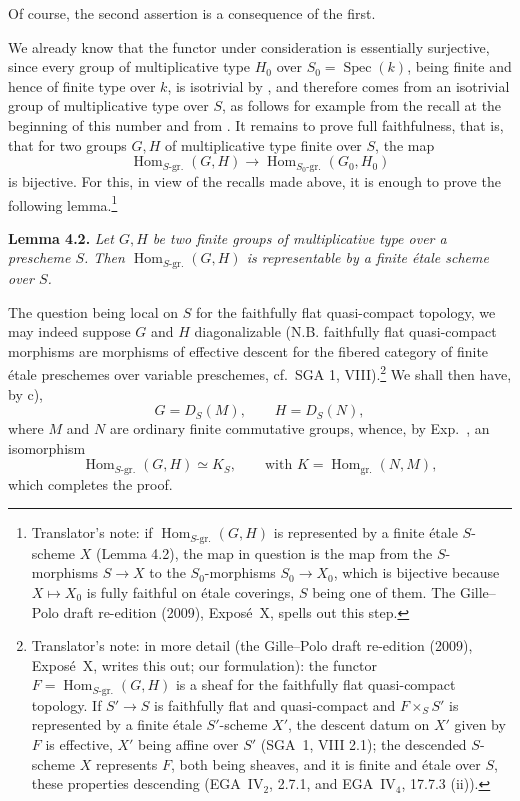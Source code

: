 Of course, the second assertion is a consequence of the first.

We already know that the functor under consideration is essentially
surjective, since every group of multiplicative type \(H_0\) over
\(S_0=\operatorname{Spec}(k)\), being finite and hence of finite type over
\(k\), is isotrivial by , and therefore comes from an isotrivial group of
multiplicative type over \(S\), as follows for example from the recall at the
beginning of this number and from . It remains to prove full
faithfulness, that is, that for two groups \(G,H\) of multiplicative type
finite over \(S\), the map
\[
  \operatorname{Hom}_{S\text{-gr.}}(G,H)
  \longrightarrow
  \operatorname{Hom}_{S_0\text{-gr.}}(G_0,H_0)
\]
is bijective. For this, in view of the recalls made above, it is enough to
prove the following lemma.\footnote{Translator's note: if
\(\operatorname{Hom}_{S\text{-gr.}}(G,H)\) is represented by a finite étale
\(S\)-scheme \(X\) (Lemma 4.2), the map in question is the map from the
\(S\)-morphisms \(S\to X\) to the \(S_0\)-morphisms \(S_0\to X_0\), which is
bijective because \(X\mapsto X_0\) is fully faithful on étale coverings, \(S\)
being one of them. The Gille--Polo draft re-edition (2009), Expos\'e~X, spells
out this step.}

\par\medskip\noindent
\textbf{Lemma 4.2.}\enspace
\emph{Let \(G,H\) be two finite groups of multiplicative type over a
prescheme \(S\). Then
\(\operatorname{Hom}_{S\text{-gr.}}(G,H)\) is representable by a finite
étale scheme over \(S\).}

The question being local on \(S\) for the faithfully flat quasi-compact
topology, we may indeed suppose \(G\) and \(H\) diagonalizable (N.B.
faithfully flat quasi-compact morphisms are morphisms of effective descent for
the fibered category of finite étale preschemes over variable preschemes, cf.\
SGA 1, VIII).\footnote{Translator's note: in more detail (the Gille--Polo
draft re-edition (2009), Expos\'e~X, writes this out; our formulation): the
functor \(F=\operatorname{Hom}_{S\text{-gr.}}(G,H)\) is a sheaf for the
faithfully flat quasi-compact topology. If \(S'\to S\) is faithfully flat and
quasi-compact and \(F\times_SS'\) is represented by a finite étale
\(S'\)-scheme \(X'\), the descent datum on \(X'\) given by \(F\) is effective,
\(X'\) being affine over \(S'\) (SGA~1, VIII 2.1); the descended \(S\)-scheme
\(X\) represents \(F\), both being sheaves, and it is finite and étale over
\(S\), these properties descending (EGA~IV\(_2\), 2.7.1, and EGA~IV\(_4\),
17.7.3 (ii)).} We shall then have, by  c),
\[
  G=D_S(M),\qquad H=D_S(N),
\]
where \(M\) and \(N\) are ordinary finite commutative groups, whence, by
Exp.~\SGARefLink{sga3:viii:corollary:1:5}{VIII 1.5}, an isomorphism
\[
  \operatorname{Hom}_{S\text{-gr.}}(G,H)\simeq K_S,
  \qquad\text{with }K=\operatorname{Hom}_{\mathrm{gr.}}(N,M),
\]
which completes the proof.

